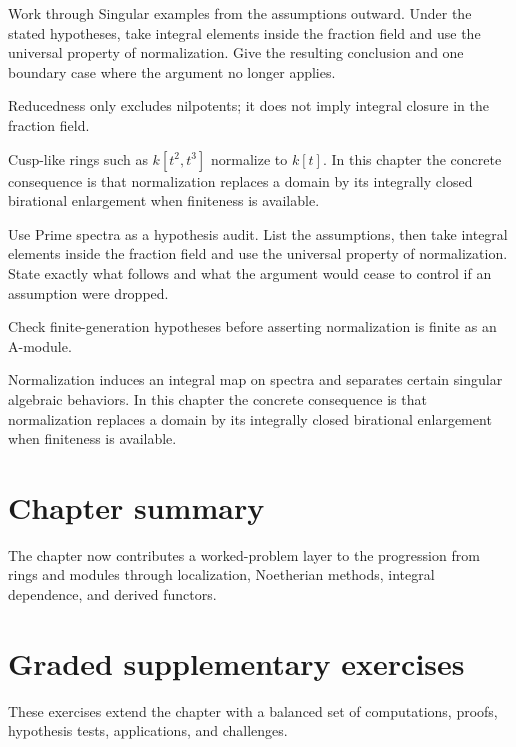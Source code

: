 \begin{exercise}\label{exr:v20-07}
Work through Singular examples from the assumptions outward. Under the stated hypotheses, take integral elements inside the fraction field and use the universal property of normalization. Give the resulting conclusion and one boundary case where the argument no longer applies.
\end{exercise}
\begin{hint}
Reducedness only excludes nilpotents; it does not imply integral closure in the fraction field.
\end{hint}
\begin{solution}
Cusp-like rings such as $k[t^2,t^3]$ normalize to $k[t]$. In this chapter the concrete consequence is that normalization replaces a domain by its integrally closed birational enlargement when finiteness is available.
\end{solution}

\begin{exercise}\label{exr:v20-08}
Use Prime spectra as a hypothesis audit. List the assumptions, then take integral elements inside the fraction field and use the universal property of normalization. State exactly what follows and what the argument would cease to control if an assumption were dropped.
\end{exercise}
\begin{hint}
Check finite-generation hypotheses before asserting normalization is finite as an A-module.
\end{hint}
\begin{solution}
Normalization induces an integral map on spectra and separates certain singular algebraic behaviors. In this chapter the concrete consequence is that normalization replaces a domain by its integrally closed birational enlargement when finiteness is available.
\end{solution}

\section*{Chapter summary}
The chapter now contributes a worked-problem layer to the progression from rings and modules through localization, Noetherian methods, integral dependence, and derived functors.
\section{Graded supplementary exercises}
These exercises extend the chapter with a balanced set of computations, proofs, hypothesis tests, applications, and challenges.

